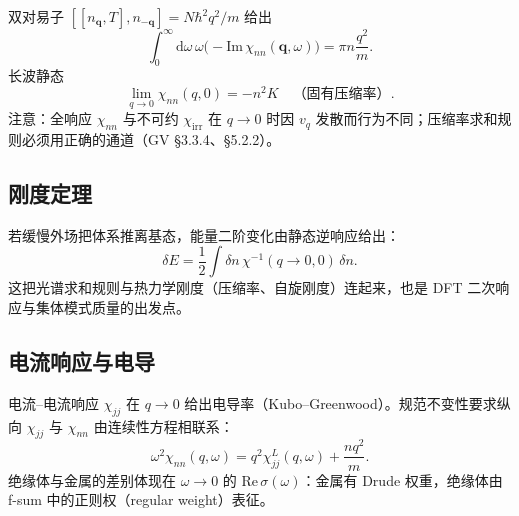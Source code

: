 双对易子 $[ [n_{\mathbf{q}},T], n_{-\mathbf{q}} ]=N\hbar^2 q^2/m$ 给出
\begin{equation}
  \int_0^{\infty}\mathrm{d}\omega\,
  \omega\bigl(-\mathrm{Im}\,\chi_{nn}(\mathbf{q},\omega)\bigr)
  =\pi n\frac{q^2}{m}.
\label{eq:fsum}
\end{equation}
长波静态
\begin{equation}
  \lim_{q\to0}\chi_{nn}(q,0)
  =-n^2 K
  \quad\text{（固有压缩率）}.
\label{eq:compr_sum}
\end{equation}
注意：全响应 $\chi_{nn}$ 与不可约 $\chi_{\mathrm{irr}}$ 在 $q\to0$ 时因 $v_q$ 发散而行为不同；压缩率求和规则必须用正确的通道（GV §3.3.4、§5.2.2）。

\subsection{刚度定理}

若缓慢外场把体系推离基态，能量二阶变化由静态逆响应给出：
\begin{equation}
  \delta E
  =\frac12
  \int
  \delta n\,
  \chi^{-1}(q\to0,0)\,
  \delta n.
\end{equation}
这把光谱求和规则与热力学刚度（压缩率、自旋刚度）连起来，也是 DFT 二次响应与集体模式质量的出发点。

\subsection{电流响应与电导}

电流--电流响应 $\chi_{jj}$ 在 $q\to0$ 给出电导率（Kubo--Greenwood）。规范不变性要求纵向 $\chi_{jj}$ 与 $\chi_{nn}$ 由连续性方程相联系：
\begin{equation}
  \omega^2\chi_{nn}(q,\omega)
  =q^2\chi_{jj}^L(q,\omega)
  +\frac{n q^2}{m}.
\end{equation}
绝缘体与金属的差别体现在 $\omega\to0$ 的 $\mathrm{Re}\,\sigma(\omega)$：金属有 Drude 权重，绝缘体由 f-sum 中的正则权（regular weight）表征。
